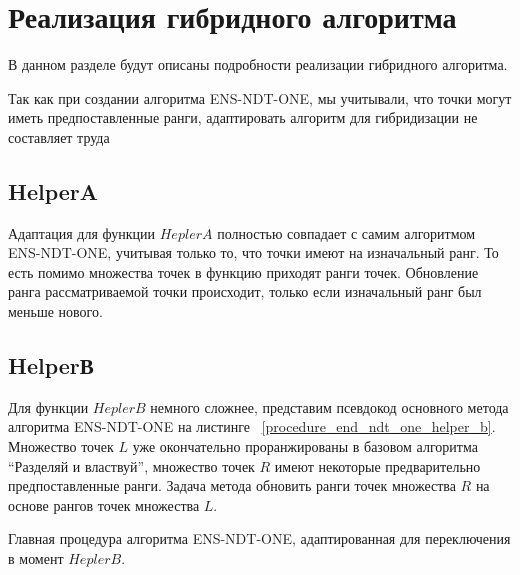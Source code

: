 \section{Реализация гибридного алгоритма}

В данном разделе будут описаны подробности реализации гибридного алгоритма.

Так как при создании алгоритма ENS-NDT-ONE, мы учитывали, что точки могут иметь предпоставленные ранги, адаптировать алгоритм для гибридизации не составляет труда 

\subsection{HelperA}

Адаптация для функции $HeplerA$ полностью совпадает с самим алгоритмом ENS-NDT-ONE, учитывая только то, что точки имеют на изначальный ранг. То есть помимо множества точек в функцию приходят ранги точек. Обновление ранга рассматриваемой точки происходит, только если изначальный ранг был меньше нового.

\subsection{HelperВ}

Для функции $HeplerB$ немного сложнее, представим псевдокод основного метода алгоритма ENS-NDT-ONE на листинге ~\ref{procedure_end_ndt_one_helper_b}. Множество точек $L$ уже окончательно проранжированы в базовом алгоритма ``Разделяй и властвуй'', множество точек $R$ имеют некоторые предварительно предпоставленные ранги. Задача метода обновить ранги точек множества $R$ на основе рангов точек множества $L$. 

\begin{algorithm}
\begin{algorithmic}[1]
        \EndIf
        \EndIf
    \EndFor
\EndProcedure
\end{algorithmic}
\caption{Главная процедура алгоритма ENS-NDT-ONE, адаптированная для переключения в момент $HeplerB$.}
\label{procedure_end_ndt_one_helper_b}
\end{algorithm}

